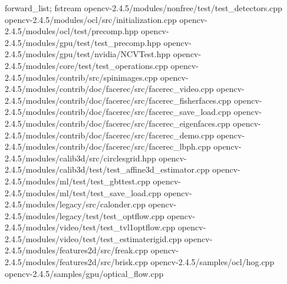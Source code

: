 \documentclass[10pt,a4paper]{article}
\begin{document}
forward\_list; fstream \newline
opencv-2.4.5/modules/nonfree/test/test\_detectors.cpp \newline
opencv-2.4.5/modules/ocl/src/initialization.cpp \newline
opencv-2.4.5/modules/ocl/test/precomp.hpp \newline
opencv-2.4.5/modules/gpu/test/test\_precomp.hpp \newline
opencv-2.4.5/modules/gpu/test/nvidia/NCVTest.hpp \newline
opencv-2.4.5/modules/core/test/test\_operations.cpp \newline
opencv-2.4.5/modules/contrib/src/spinimages.cpp \newline
opencv-2.4.5/modules/contrib/doc/facerec/src/facerec\_video.cpp \newline
opencv-2.4.5/modules/contrib/doc/facerec/src/facerec\_fisherfaces.cpp \newline
opencv-2.4.5/modules/contrib/doc/facerec/src/facerec\_save\_load.cpp \newline
opencv-2.4.5/modules/contrib/doc/facerec/src/facerec\_eigenfaces.cpp \newline
opencv-2.4.5/modules/contrib/doc/facerec/src/facerec\_demo.cpp \newline
opencv-2.4.5/modules/contrib/doc/facerec/src/facerec\_lbph.cpp \newline
opencv-2.4.5/modules/calib3d/src/circlesgrid.hpp \newline
opencv-2.4.5/modules/calib3d/test/test\_affine3d\_estimator.cpp \newline
opencv-2.4.5/modules/ml/test/test\_gbttest.cpp \newline
opencv-2.4.5/modules/ml/test/test\_save\_load.cpp \newline
opencv-2.4.5/modules/legacy/src/calonder.cpp \newline
opencv-2.4.5/modules/legacy/test/test\_optflow.cpp \newline
opencv-2.4.5/modules/video/test/test\_tvl1optflow.cpp \newline
opencv-2.4.5/modules/video/test/test\_estimaterigid.cpp \newline
opencv-2.4.5/modules/features2d/src/freak.cpp \newline
opencv-2.4.5/modules/features2d/src/brisk.cpp \newline
opencv-2.4.5/samples/ocl/hog.cpp \newline
opencv-2.4.5/samples/gpu/optical\_flow.cpp \newline
\end{document}

